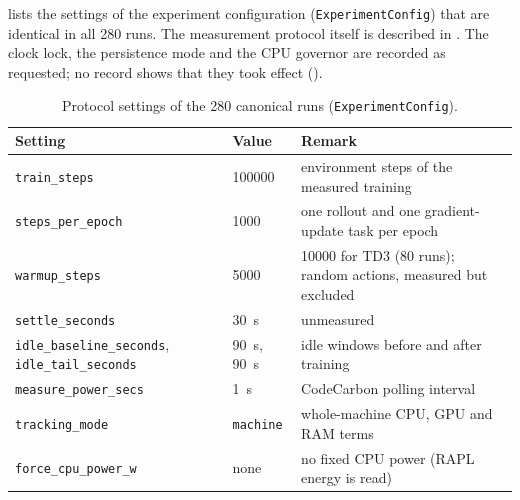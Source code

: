  lists the settings of the experiment configuration (\texttt{ExperimentConfig}) that are identical in all \num{280} runs.
The measurement protocol itself is described in .
The clock lock, the persistence mode and the CPU governor are recorded as requested; no record shows that they took effect ().

\begin{table}[tbp]
  \centering
  \footnotesize
  \caption{Protocol settings of the \num{280} canonical runs (\texttt{ExperimentConfig}).}
  \label{tab:app-hp-protocol}
  \begin{tabular}{@{}p{4.7cm}p{3.7cm}p{5.0cm}@{}}
    \toprule
    Setting                                                              & Value                          & Remark                                                   \\
    \midrule
    \texttt{train\_\allowbreak steps}                                                & \num{100000}                   & environment steps of the measured training              \\
    \texttt{steps\_\allowbreak per\_\allowbreak epoch}                                           & \num{1000}                     & one rollout and one gradient-update task per epoch      \\
    \texttt{warmup\_\allowbreak steps}                                               & \num{5000}                     & \num{10000} for TD3 (\num{80} runs); random actions, measured but excluded \\
    \texttt{settle\_\allowbreak seconds}                                             & \SI{30}{\second}               & unmeasured                                               \\
    \texttt{idle\_\allowbreak baseline\_\allowbreak seconds}, \texttt{idle\_\allowbreak tail\_\allowbreak seconds}       & \SI{90}{\second}, \SI{90}{\second} & idle windows before and after training               \\
    \texttt{measure\_\allowbreak power\_\allowbreak secs}                                        & \SI{1}{\second}                & CodeCarbon polling interval                             \\
    \texttt{tracking\_\allowbreak mode}                                              & \texttt{machine}               & whole-machine CPU, GPU and RAM terms                     \\
    \texttt{force\_\allowbreak cpu\_\allowbreak power\_\allowbreak w}                                        & none                           & no fixed CPU power (RAPL energy is read)                \\

\end{tabular}
\end{table}
